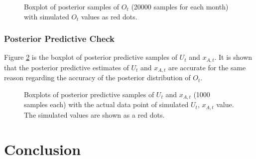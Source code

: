 \documentclass[12pt]{article}
\begin{document}
{\begin{figure}[htb]
	\caption[Unobserved $N$: boxplot of posterior samples of $O_t$]{Boxplot of posterior samples of $O_t$ (20000 samples for each month) with simulated $O_t$ values as red dots.}
	\label{pst_ot_unk_n}
\end{figure}

\subsubsection{Posterior Predictive Check}

Figure \ref{ppc_unk_n} is the boxplot of posterior predictive samples of $U_t$ and $x_{A,t}$. It is shown that the posterior predictive estimates of $U_t$ and $x_{A,t}$ are accurate for the same reason regarding the accuracy of the posterior distribution of $O_t$.

\begin{figure}[htb]
	\centering
	\caption[Unobserved $N$: box plots of predictive posterior samples of $U_t$ and $x_{A,t}$]{Boxplots of posterior predictive samples of $U_t$ and $x_{A,t}$ (1000 samples each) with the actual data point of simulated $U_t$, $x_{A,t}$ value. The simulated values are shown as a red dots.}
	\label{ppc_unk_n}
\end{figure}

\section{Conclusion}
 
}
\end{document}

